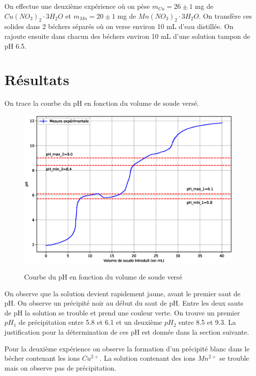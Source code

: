 \documentclass[12pt]{article}
\begin{document}
On effectue une deuxième expérience où on pèse $m_{Cu} = 26 \pm 1$ mg de $Cu(NO_3)_2 \cdot 3 H_2O$ et $m_{Mn}= 20 \pm 1$ mg de $Mn(NO_3)_2\cdot 3 H_2O$. On transfère ces solides dans 2 béchers séparés où on verse environ 10 mL d'eau distillée. On rajoute ensuite dans chacun des béchers environ 10 mL d'une solution tampon de pH 6.5. 


\section{Résultats}
On trace la courbe du pH en fonction du volume de soude versé.
\begin{figure}[p]
	\begin{center}
		\includegraphics[angle=-90,scale=0.9]{Courbe_dosage.eps}
		\label{img:Courbe dosage}
		\caption{Courbe du pH en fonction du volume de soude versé}
	\end{center}
\end{figure}



On observe que la solution devient rapidement jaune, avant le premier saut de pH. On observe un précipité noir au début du saut de pH. Entre les deux sauts de pH la solution se trouble et prend une couleur verte.
On trouve un premier $pH_1$ de précipitation entre 5.8 et 6.1 et un deuxième $pH_2$ entre 8.5 et 9.3. La justification pour la détermination de ces pH est donnée dans la section suivante.

Pour la deuxième expérience on observe la formation d'un précipité blanc dans le bécher contenant les ions $Cu^{2+}$. La solution contenant des ions $Mn^{2+}$ se trouble mais on observe pas de précipitation. 
\end{document}
